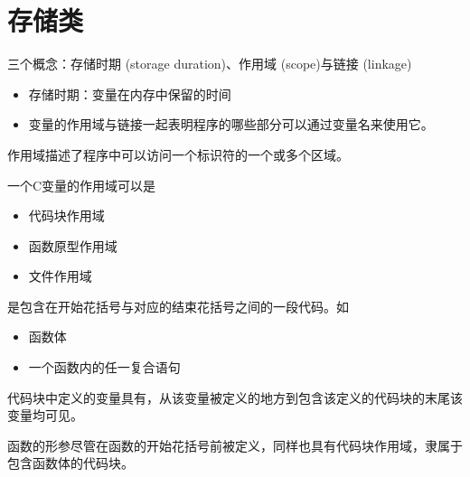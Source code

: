 \section{存储类}

\begin{frame}[fragile]\ft{\secname}
  三个概念：存储时期{ (storage duration)}、作用域{ (scope)}与链接{ (linkage)}
  \begin{itemize}
  \item 存储时期：变量在内存中保留的时间
  \item 变量的作用域与链接一起表明程序的哪些部分可以通过变量名来使用它。
  \end{itemize}
\end{frame}

\begin{frame}[fragile]
  作用域描述了程序中可以访问一个标识符的一个或多个区域。\vspace{0.1in}

  一个C变量的作用域可以是
  \begin{itemize}
  \item 代码块作用域
  \item 函数原型作用域
  \item 文件作用域
  \end{itemize}

\end{frame}

\begin{frame}[fragile]
  是包含在开始花括号与对应的结束花括号之间的一段代码。如
  \begin{itemize}
  \item 函数体
  \item 一个函数内的任一复合语句
  \end{itemize}
\end{frame}

\begin{frame}[fragile]

  代码块中定义的变量具有，从该变量被定义的地方到包含该定义的代码块的末尾该变量均可见。\vspace{0.1in}

  \begin{zhu}
    函数的形参尽管在函数的开始花括号前被定义，同样也具有代码块作用域，隶属于包含函数体的代码块。
  \end{zhu}

\end{frame}

